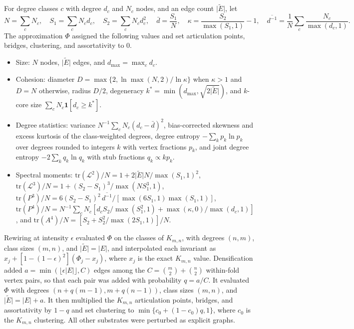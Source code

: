 \documentclass{article}
\begin{document}
For degree classes $c$ with degree $d_c$ and $N_c$ nodes, and an edge count $\lvert \widetilde{E} \rvert$, let
\begin{equation*}
N = \sum_c N_c, \quad S_1 = \sum_c N_c d_c, \quad S_2 = \sum_c N_c d_c^{2}, \quad \bar{d} = \frac{S_1}{N}, \quad \kappa = \frac{S_2}{\max(S_1, 1)} - 1, \quad \overline{d^{-1}} = \frac{1}{N} \sum_c \frac{N_c}{\max(d_c, 1)}.
\end{equation*}
The approximation $\Phi$ assigned the following values and set articulation points, bridges, clustering, and assortativity to 0.
\begin{itemize}[leftmargin=1.5em,itemsep=0.2em]
\item Size: $N$ nodes, $\lvert \widetilde{E} \rvert$ edges, and $d_{\max} = \max_c d_c$.
\item Cohesion: diameter $D = \max\{2, \ln \max(N, 2) / \ln \kappa\}$ when $\kappa > 1$ and $D = N$ otherwise, radius $D/2$, degeneracy $k^{*} = \min(d_{\max}, \sqrt{2\lvert \widetilde{E} \rvert})$, and $k$-core size $\sum_c N_c \mathbf{1}[d_c \ge k^{*}]$.
\item Degree statistics: variance $N^{-1} \sum_c N_c (d_c - \bar{d})^2$, bias-corrected skewness and excess kurtosis of the class-weighted degrees, degree entropy $-\sum_k p_k \ln p_k$ over degrees rounded to integers $k$ with vertex fractions $p_k$, and joint degree entropy $-2 \sum_k q_k \ln q_k$ with stub fractions $q_k \propto k p_k$.
\item Spectral moments: $\mathrm{tr}(\mathcal{L}^2)/N = 1 + 2\lvert \widetilde{E} \rvert N / \max(S_1, 1)^2$, $\mathrm{tr}(\mathcal{L}^3)/N = 1 + (S_2 - S_1)^3 / \max(N S_1^3, 1)$, $\mathrm{tr}(P^3)/N = 6 (S_2 - S_1)^2\, \overline{d^{-1}} / [\max(6 S_1, 1) \max(S_1, 1)]$, $\mathrm{tr}(P^4)/N = N^{-1} \sum_c N_c [d_c S_2 / \max(S_1^2, 1) + \max(\kappa, 0) / \max(d_c, 1)]$, and $\mathrm{tr}(A^4)/N = [S_2 + S_2^2 / \max(2 S_1, 1)] / N$.
\end{itemize}
Rewiring at intensity $\epsilon$ evaluated $\Phi$ on the classes of $K_{m,n}$, with degrees $(n, m)$, class sizes $(m, n)$, and $\lvert \widetilde{E} \rvert = \lvert E \rvert$, and interpolated each invariant as $x_j + [1 - (1 - \epsilon)^2](\Phi_j - x_j)$, where $x_j$ is the exact $K_{m,n}$ value. Densification added $a = \min(\lfloor \epsilon \lvert E \rvert \rfloor, C)$ edges among the $C = \binom{m}{2} + \binom{n}{2}$ within-fold vertex pairs, so that each pair was added with probability $q = a / C$. It evaluated $\Phi$ with degrees $(n + q(m - 1), m + q(n - 1))$, class sizes $(m, n)$, and $\lvert \widetilde{E} \rvert = \lvert E \rvert + a$. It then multiplied the $K_{m,n}$ articulation points, bridges, and assortativity by $1 - q$ and set clustering to $\min\{c_0 + (1 - c_0) q, 1\}$, where $c_0$ is the $K_{m,n}$ clustering. All other substrates were perturbed as explicit graphs.
\end{document}
